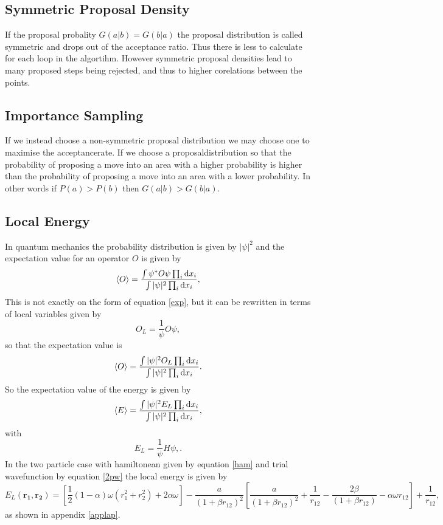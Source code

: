 \documentclass[a4paper,norsk,10pt]{article}
\newcommand{\bb}[1]{\boldsymbol{#1}}
\newcommand{\dd}{\mathrm{d}}
\newcommand{\be}{\begin{equation}}
\newcommand{\ee}{\end{equation}}
\newcommand{\f}{\frac}
\begin{document}
  

\subsection{Symmetric Proposal Density}

If the proposal probality $G(a|b) = G(b|a)$ the proposal distribution is called symmetric and drops out of the acceptance ratio.
Thus there is less to calculate for each loop in the algortihm. However symmetric proposal densities lead to many proposed steps being rejected,
and thus to higher corelations between the points.


\subsection{Importance Sampling}

If we instead choose a non-symmetric proposal distribution we may choose one to maximise the acceptancerate.
If we choose a proposaldistribution so that the probability of proposing a move into an area with a higher probability is higher than
the probability of proposing a move into an area with a lower probability. In other words
if $P(a)>P(b)$ then $G(a|b)>G(b|a)$.

\subsection{Local Energy}
In quantum mechanics the probability distribution is given by $|\psi|^2$ and the expectation value for an operator $O$ is given by
\be
\braket{O} = \f{\int\psi^*O\psi\prod_i\dd x_i}{\int|\psi|^2\prod_i\dd x_i},
\ee
This is not exactly on the form of equation \ref{exp}, but it can be rewritten in terms of local variables given by
\be
O_L = \f{1}{\psi}O\psi, \label{localdef}
\ee
so that the expectation value is
\be
\braket{O} =  \f{\int|\psi|^2O_L\prod_i\dd x_i}{\int|\psi|^2\prod_i\dd x_i}.
\ee
So the expectation value of the energy is given by
\be
\braket{E} =  \f{\int|\psi|^2E_L\prod_i\dd x_i}{\int|\psi|^2\prod_i\dd x_i},
\ee
with
\be
E_L = \f{1}{\psi}H\psi, \label{localEdef}.
\ee
In the two particle case with hamiltonean given by equation \ref{ham} and trial wavefunction by equation \ref{2pw} the local energy is given by
\be
E_L(\bb{r_1},\bb{r_2}) = \left[\f{1}{2}(1- \alpha)\omega(r_1^2 + r_2^2) + 2\alpha\omega\right]  - \f{a}{(1+\beta r_{12})^2}\left[\f{a}{(1+\beta r_{12})^2}+  \f{1}{r_{12}} - \f{2\beta}{(1+\beta r_{12})} -\alpha\omega r_{12}\right] + \f{1}{r_{12}},
\ee
as shown in appendix \ref{applap}.
\end{document}
